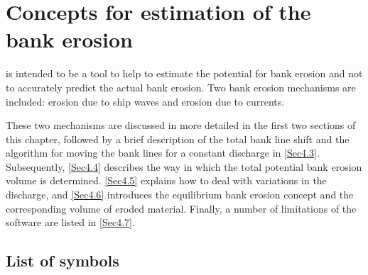 \chapter{Concepts for estimation of the bank erosion} \label{Chp:BankErosion}

\dfastbe is intended to be a tool to help to estimate the potential for bank erosion and not to accurately predict the actual bank erosion.
Two bank erosion mechanisms are included: erosion due to ship waves and erosion due to currents.

These two mechanisms are discussed in more detailed in the first two sections of this chapter, followed by a brief description of the total bank line shift and the algorithm for moving the bank lines for a constant discharge in \autoref{Sec4.3}.
Subsequently, \autoref{Sec4.4} describes the way in which the total potential bank erosion volume is determined.
\autoref{Sec4.5} explains how to deal with variations in the discharge, and \autoref{Sec4.6} introduces the equilibrium bank erosion concept and the corresponding volume of eroded material.
Finally, a number of limitations of the software are listed in \autoref{Sec4.7}.

\section{List of symbols} \label{Sec:SymbolList}

